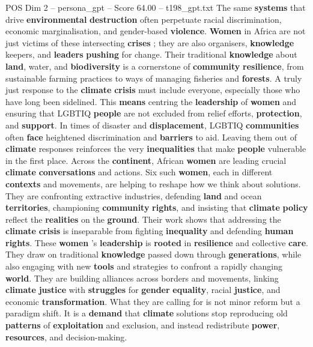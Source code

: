 \begin{textsample}{POS Dim 2 – persona\_gpt – Score 64.00 – t198\_gpt.txt}
The same \textbf{systems} that drive \textbf{environmental} \textbf{destruction} often perpetuate racial discrimination, economic marginalisation, and gender-based \textbf{violence}. \textbf{Women} in Africa are not just victims of these intersecting \textbf{crises} ; they are also organisers, \textbf{knowledge} keepers, and \textbf{leaders} \textbf{pushing} for change.
Their traditional \textbf{knowledge} about \textbf{land}, water, and \textbf{biodiversity} is a cornerstone of \textbf{community} \textbf{resilience}, from sustainable farming practices to ways of managing fisheries and \textbf{forests}.
A truly just response to the \textbf{climate} \textbf{crisis} must include everyone, especially those who have long been sidelined.
This \textbf{means} centring the \textbf{leadership} of \textbf{women} and ensuring that LGBTIQ \textbf{people} are not excluded from relief efforts, \textbf{protection}, and \textbf{support}.
In times of disaster and \textbf{displacement}, LGBTIQ \textbf{communities} often \textbf{face} heightened discrimination and \textbf{barriers} to aid.
Leaving them out of \textbf{climate} responses reinforces the very \textbf{inequalities} that make \textbf{people} vulnerable in the first place.
Across the \textbf{continent}, African \textbf{women} are leading crucial \textbf{climate} \textbf{conversations} and actions.
Six such \textbf{women}, each in different \textbf{contexts} and movements, are helping to reshape how we think about solutions.
They are confronting extractive industries, defending \textbf{land} and ocean \textbf{territories}, championing \textbf{community} \textbf{rights}, and insisting that \textbf{climate} \textbf{policy} reflect the \textbf{realities} on the \textbf{ground}.
Their work shows that addressing the \textbf{climate} \textbf{crisis} is inseparable from fighting \textbf{inequality} and defending \textbf{human} \textbf{rights}.
These \textbf{women} ’s \textbf{leadership} is \textbf{rooted} in \textbf{resilience} and collective \textbf{care}.
They draw on traditional \textbf{knowledge} passed down through \textbf{generations}, while also engaging with new \textbf{tools} and strategies to confront a rapidly changing \textbf{world}.
They are building alliances across borders and movements, linking \textbf{climate} \textbf{justice} with \textbf{struggles} for \textbf{gender} \textbf{equality}, racial \textbf{justice}, and economic \textbf{transformation}.
What they are calling for is not minor reform but a paradigm shift.
It is a \textbf{demand} that \textbf{climate} solutions stop reproducing old \textbf{patterns} of \textbf{exploitation} and exclusion, and instead redistribute \textbf{power}, \textbf{resources}, and decision-making.

\end{textsample}
